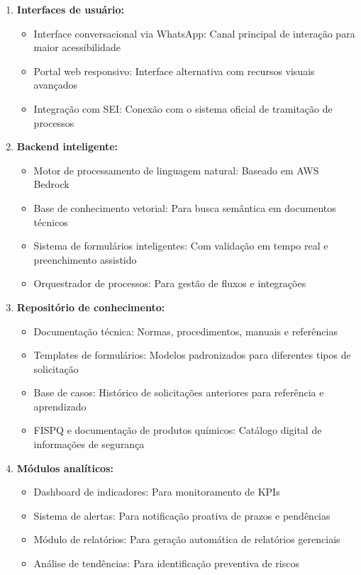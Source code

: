 \documentclass[12pt,a4paper]{article}
\begin{document}
\begin{enumerate}
    \item \textbf{Interfaces de usuário:}
    \begin{itemize}
        \item Interface conversacional via WhatsApp: Canal principal de interação para maior acessibilidade
        \item Portal web responsivo: Interface alternativa com recursos visuais avançados
        \item Integração com SEI: Conexão com o sistema oficial de tramitação de processos
    \end{itemize}
    
    \item \textbf{Backend inteligente:}
    \begin{itemize}
        \item Motor de processamento de linguagem natural: Baseado em AWS Bedrock
        \item Base de conhecimento vetorial: Para busca semântica em documentos técnicos
        \item Sistema de formulários inteligentes: Com validação em tempo real e preenchimento assistido
        \item Orquestrador de processos: Para gestão de fluxos e integrações
    \end{itemize}
    
    \item \textbf{Repositório de conhecimento:}
    \begin{itemize}
        \item Documentação técnica: Normas, procedimentos, manuais e referências
        \item Templates de formulários: Modelos padronizados para diferentes tipos de solicitação
        \item Base de casos: Histórico de solicitações anteriores para referência e aprendizado
        \item FISPQ e documentação de produtos químicos: Catálogo digital de informações de segurança
    \end{itemize}
    
    \item \textbf{Módulos analíticos:}
    \begin{itemize}
        \item Dashboard de indicadores: Para monitoramento de KPIs
        \item Sistema de alertas: Para notificação proativa de prazos e pendências
        \item Módulo de relatórios: Para geração automática de relatórios gerenciais
        \item Análise de tendências: Para identificação preventiva de riscos
    \end{itemize}
\end{enumerate}
\end{document}
